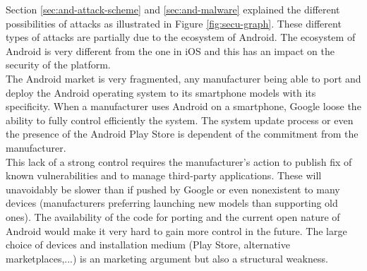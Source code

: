Section \ref{sec:and-attack-scheme} and \ref{sec:and-malware} explained the different possibilities of attacks as illustrated in Figure \ref{fig:secu-graph}.
These different types of attacks are partially due to the ecosystem of Android.
The ecosystem of Android is very different from the one in iOS and this has an impact on the security of the platform.\\

The Android market is very fragmented, any manufacturer being able to port and deploy the Android operating system to its smartphone models with its specificity.
When a manufacturer uses Android on a smartphone, Google loose the ability to fully control efficiently the system.
The system update process or even the presence of the Android Play Store is dependent of the commitment from the manufacturer.\\

This lack of a strong control requires  the manufacturer's action to publish fix of known vulnerabilities and to manage third-party applications.
These will unavoidably be slower than if pushed by Google or even nonexistent to many devices (manufacturers preferring launching new models than supporting old ones).
The availability of the code for porting and the current open nature of Android would make it very hard to gain more control in the future.
The large choice of devices and installation medium (Play Store, alternative marketplaces,...) is an marketing argument but also a structural weakness.
